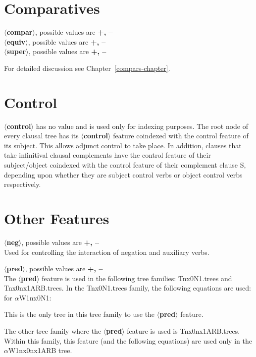 \section{Comparatives}
{\bf $\langle$compar$\rangle$}, possible values are {\bf +, --}\\
{\bf $\langle$equiv$\rangle$}, possible values are {\bf +, --}\\
{\bf $\langle$super$\rangle$}, possible values are {\bf +, --}

For detailed discussion see Chapter~\ref{compars-chapter}.

\section{Control}
{\bf $\langle$control$\rangle$} has no value and is used only for indexing
purposes.  The root node of every clausal tree has its {\bf
$\langle$control$\rangle$} feature coindexed with the control feature of
its subject.  This allows adjunct control to take place. In addition,
clauses that take infinitival clausal complements have the control feature
of their subject/object coindexed with the control feature of their
complement clause S, depending upon whether they are subject control verbs
or object control verbs respectively.


\section{Other Features}
{\bf $\langle$neg$\rangle$}, possible values are {\bf +, --}\\
Used for controlling the interaction of negation and auxiliary verbs.

{\bf $\langle$pred$\rangle$}, possible values are {\bf +, --}\\
The {\bf $\langle$pred$\rangle$} feature is used in the following tree
families: Tnx0N1.trees and Tnx0nx1ARB.trees.
In the Tnx0N1.trees family, the following equations are used:\\
for $\alpha$W1nx0N1:


This is the only tree in this tree family to use the 
{\bf $\langle$pred$\rangle$} feature.

The other tree family where the {\bf $\langle$pred$\rangle$} feature is
used is Tnx0nx1ARB.trees.  Within this family, this feature (and the
following equations) are used only in the $\alpha$W1nx0nx1ARB tree.

